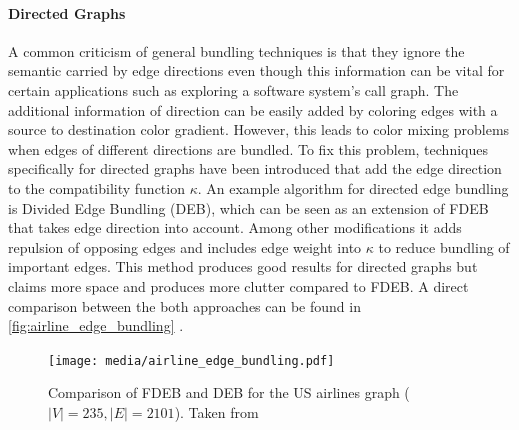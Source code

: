 \paragraph*{Directed Graphs}  A common criticism of general bundling techniques is that they ignore the semantic carried by edge directions even though this information can be vital for certain applications such as exploring a software system's call graph. The additional information of direction can be easily added by coloring edges with a source to destination color gradient. However, this leads to color mixing problems when edges of different directions are bundled. To fix this problem, techniques specifically for directed graphs have been introduced that add the edge direction to the compatibility function $\kappa$. An example algorithm for directed edge bundling is Divided Edge Bundling (DEB)\cite{Selassie2011}, which can be seen as an extension of FDEB that takes edge direction into account. Among other modifications it adds repulsion of opposing edges and includes edge weight into $\kappa$ to reduce bundling of important edges. This method produces good results for directed graphs but claims more space and produces more clutter compared to FDEB. A direct comparison between the both approaches can be found in \autoref{fig:airline_edge_bundling} \cite{Lhuillier2017}.\\


\begin{figure}
    \centering
    \texttt{[image: media/airline\_edge\_bundling.pdf]}
    \caption{Comparison of FDEB and DEB for the US airlines graph ($|V| = 235, |E| = 2101$). Taken from\cite{Lhuillier2017}}
    \label{fig:airline_edge_bundling}
\end{figure}


